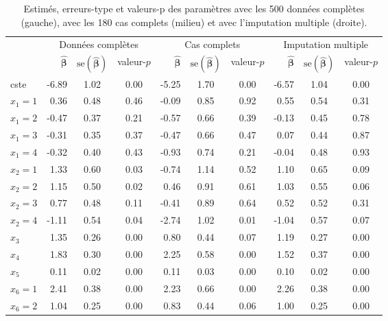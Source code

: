 \documentclass[
  11pt,
  letterpaper,
]{book}
\theoremstyle{definition}
\theoremstyle{remark}
\begin{document}
\hypertarget{tbl-missing3r}{}
\begin{table}
\caption{\label{tbl-missing3r}Estimés, erreurs-type et valeurs-p des paramètres avec les 500 données
complètes (gauche), avec les 180 cas complets (milieu) et avec
l'imputation multiple (droite). }\tabularnewline

\centering
\begin{tabular}{lrccrccrcc}
\toprule
\multicolumn{1}{c}{} & \multicolumn{3}{c}{Données complètes} & \multicolumn{3}{c}{Cas complets} & \multicolumn{3}{c}{Imputation multiple} \\
\cmidrule(l{3pt}r{3pt}){2-4} \cmidrule(l{3pt}r{3pt}){5-7} \cmidrule(l{3pt}r{3pt}){8-10}
  & \(\widehat{\boldsymbol{\beta}}\) & \(\mathrm{se}(\widehat{\boldsymbol{\beta}})\) & valeur-\(p\) & \(\widehat{\boldsymbol{\beta}}\) & \(\mathrm{se}(\widehat{\boldsymbol{\beta}})\) & valeur-\(p\) & \(\widehat{\boldsymbol{\beta}}\) & \(\mathrm{se}(\widehat{\boldsymbol{\beta}})\) & valeur-\(p\)\\
\midrule
cste & -6.89 & 1.02 & 0.00 & -5.25 & 1.70 & 0.00 & -6.57 & 1.04 & 0.00\\
\(x_1=1\) & 0.36 & 0.48 & 0.46 & -0.09 & 0.85 & 0.92 & 0.55 & 0.54 & 0.31\\
\(x_1=2\) & -0.47 & 0.37 & 0.21 & -0.57 & 0.66 & 0.39 & -0.13 & 0.45 & 0.78\\
\(x_1=3\) & -0.31 & 0.35 & 0.37 & -0.47 & 0.66 & 0.47 & 0.07 & 0.44 & 0.87\\
\(x_1=4\) & -0.32 & 0.40 & 0.43 & -0.93 & 0.74 & 0.21 & -0.04 & 0.48 & 0.93\\
\addlinespace
\(x_2=1\) & 1.33 & 0.60 & 0.03 & -0.74 & 1.14 & 0.52 & 1.10 & 0.65 & 0.09\\
\(x_2=2\) & 1.15 & 0.50 & 0.02 & 0.46 & 0.91 & 0.61 & 1.03 & 0.55 & 0.06\\
\(x_2=3\) & 0.77 & 0.48 & 0.11 & -0.41 & 0.89 & 0.64 & 0.52 & 0.52 & 0.31\\
\(x_2=4\) & -1.11 & 0.54 & 0.04 & -2.74 & 1.02 & 0.01 & -1.04 & 0.57 & 0.07\\
\(x_3\) & 1.35 & 0.26 & 0.00 & 0.80 & 0.44 & 0.07 & 1.19 & 0.27 & 0.00\\
\addlinespace
\(x_4\) & 1.83 & 0.30 & 0.00 & 2.25 & 0.58 & 0.00 & 1.52 & 0.37 & 0.00\\
\(x_5\) & 0.11 & 0.02 & 0.00 & 0.11 & 0.03 & 0.00 & 0.10 & 0.02 & 0.00\\
\(x_6=1\) & 2.41 & 0.38 & 0.00 & 2.23 & 0.66 & 0.00 & 2.26 & 0.38 & 0.00\\
\(x_6=2\) & 1.04 & 0.25 & 0.00 & 0.83 & 0.44 & 0.06 & 1.00 & 0.25 & 0.00\\
\bottomrule
\end{tabular}
\end{table}
\end{document}

